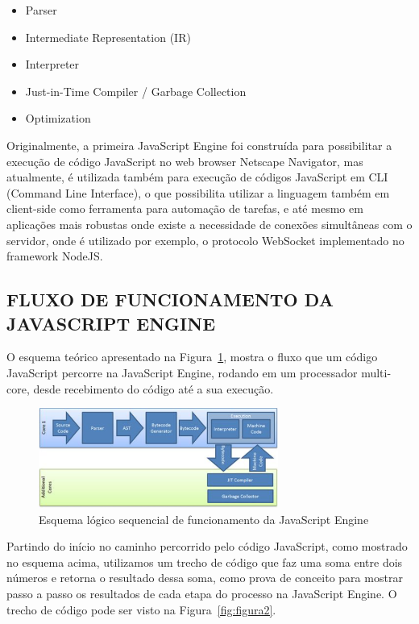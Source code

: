 \documentclass[12pt,a4paper]{article}
\begin{document}
\begin{itemize}
	\item Parser
	\item Intermediate Representation (IR)
	\item Interpreter
	\item Just-in-Time Compiler / Garbage Collection
	\item Optimization
\end{itemize}

Originalmente, a primeira JavaScript Engine foi construída para possibilitar a execução de código JavaScript no web browser Netscape Navigator, mas atualmente, é utilizada também para execução de códigos JavaScript em CLI (Command Line Interface), o que possibilita utilizar a linguagem também em client-side como ferramenta para automação de tarefas, e até mesmo em aplicações mais robustas onde existe a necessidade de conexões simultâneas com o servidor, onde é utilizado por exemplo, o protocolo WebSocket 	implementado no framework NodeJS.

\subsection{FLUXO DE FUNCIONAMENTO DA JAVASCRIPT ENGINE}
\label{sec:subsection51}

O esquema teórico apresentado na Figura~\ref{fig:figura1}, mostra o fluxo que um código JavaScript percorre na JavaScript Engine, rodando em um processador multi-core, desde recebimento do código até a sua execução. \\

\begin{figure}[h]
	\centering
	\includegraphics[width=0.7\textwidth]{figura1.png}
	\caption{Esquema lógico sequencial de funcionamento da JavaScript Engine}
	\label{fig:figura1}
\end{figure}

Partindo do início no caminho percorrido pelo código JavaScript, como mostrado no esquema acima, utilizamos um trecho de código que faz uma soma entre dois números e retorna o resultado dessa soma, como prova de conceito para mostrar passo a passo os resultados de cada etapa do processo na JavaScript Engine. O trecho de código pode ser visto na Figura~\ref{fig:figura2}. \\
\end{document}
